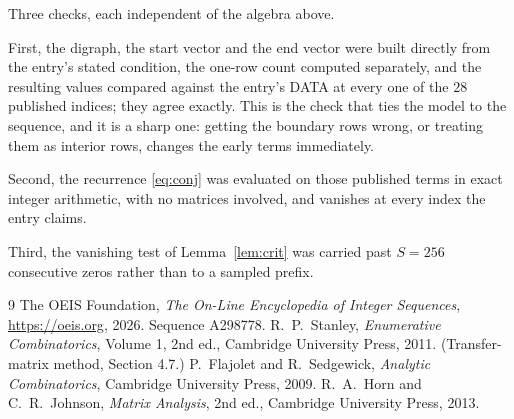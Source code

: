 \documentclass[11pt,a4paper]{article}
\theoremstyle{plain}
\theoremstyle{definition}
\begin{document}
Three checks, each independent of the algebra above.

First, the digraph, the start vector and the end vector were built directly from the
entry's stated condition, the one-row count computed separately, and the resulting values
compared against the entry's DATA at every one of the $28$ published indices; they
agree exactly. This is the check that ties the model to the sequence, and it is a sharp one:
getting the boundary rows wrong, or treating them as interior rows, changes the early terms
immediately.

Second, the recurrence \eqref{eq:conj} was evaluated on those published terms in exact
integer arithmetic, with no matrices involved, and vanishes at every index the entry claims.

Third, the vanishing test of Lemma~\ref{lem:crit} was carried past $S=256$ consecutive
zeros rather than to a sampled prefix.

\begin{thebibliography}{9}
 The OEIS Foundation, \emph{The On-Line Encyclopedia of Integer
Sequences}, \url{https://oeis.org}, 2026. Sequence A298778.
 R.~P.~Stanley, \emph{Enumerative Combinatorics}, Volume 1, 2nd ed.,
Cambridge University Press, 2011. (Transfer-matrix method, Section 4.7.)
 P.~Flajolet and R.~Sedgewick, \emph{Analytic Combinatorics}, Cambridge
University Press, 2009.
 R.~A.~Horn and C.~R.~Johnson, \emph{Matrix Analysis}, 2nd ed., Cambridge
University Press, 2013.
\end{thebibliography}
\end{document}
